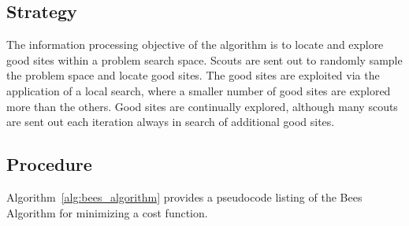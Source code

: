 \subsection{Strategy}
The information processing objective of the algorithm is to locate and explore good sites within a problem search space.
Scouts are sent out to randomly sample the problem space and locate good sites. The good sites are exploited via the application of a local search, where a smaller number of good sites are explored more than the others. Good sites are continually explored, although many scouts are sent out each iteration always in search of additional good sites.

\subsection{Procedure}
Algorithm~\ref{alg:bees_algorithm} provides a pseudocode listing of the Bees Algorithm for minimizing a cost function. 

